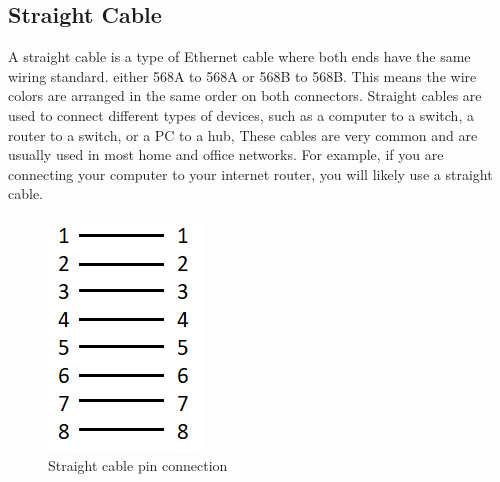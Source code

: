 \documentclass[a4paper]{article}
\begin{document}
\subsection{Straight Cable}
A straight cable is a type of Ethernet cable where both ends have the same wiring standard. either 568A to 568A or 568B to 568B. This means the wire colors are arranged in the same order on both connectors. Straight cables are used to connect different types of devices, such as a computer to a switch, a router to a switch, or a PC to a hub, These cables are very common and are usually used in most home and office networks. For example, if you are connecting your computer to your internet router, you will likely use a straight cable.
\begin{figure}[h]
    \centering
    \includegraphics[width=0.3\linewidth]{straight-cable.png}
    \caption{Straight cable pin connection}
\end{figure}
\pagebreak
\end{document}
